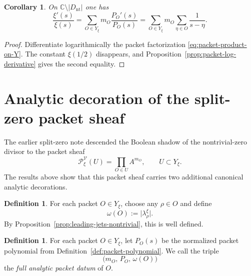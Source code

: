 \documentclass[11pt,a4paper]{article}
\newtheorem{corollary}[theorem]{Corollary}
\theoremstyle{definition}
\newtheorem{definition}[theorem]{Definition}
\theoremstyle{remark}
\newcommand{\CC}{\mathbb C}
\newcommand{\cV}{\mathcal V}
\begin{document}
\begin{corollary}\label{cor:xi-log-derivative-packet}
On $\CC\setminus |D_{\mathrm{nt}}|$ one has
\begin{equation}\label{eq:xi-log-derivative-packet}
\frac{\xi'(s)}{\xi(s)}=\sum_{O\in Y_\xi} m_O\frac{P_O'(s)}{P_O(s)}
=\sum_{O\in Y_\xi} m_O\sum_{\eta\in O}\frac{1}{s-\eta}.
\end{equation}
\end{corollary}

\begin{proof}
Differentiate logarithmically the packet factorization \eqref{eq:packet-product-on-Y}.  The constant $\xi(1/2)$ disappears, and Proposition~\ref{prop:packet-log-derivative} gives the second equality.
\end{proof}

\section{Analytic decoration of the split-zero packet sheaf}

The earlier split-zero note descended the Boolean shadow of the nontrivial-zero divisor to the packet sheaf
\[
\mathcal P_\xi^{\cV}(U)=\prod_{O\in U} A^{m_O},
\qquad U\subset Y_\xi.
\]
The results above show that this packet sheaf carries two additional canonical analytic decorations.

\begin{definition}
For each packet $O\in Y_\xi$, choose any $\rho\in O$ and define
\[
\omega(O):=\bigl|\lambda_\rho^{\xi}\bigr|.
\]
By Proposition~\ref{prop:leading-jets-nontrivial}, this is well defined.
\end{definition}

\begin{definition}
For each packet $O\in Y_\xi$, let $P_O(s)$ be the normalized packet polynomial from Definition~\ref{def:packet-polynomial}.  We call the triple
\begin{equation}\label{eq:analytic-packet-data}
\bigl(m_O,\,P_O,\,\omega(O)\bigr)
\end{equation}
the \emph{full analytic packet datum} of $O$.
\end{definition}
\end{document}
